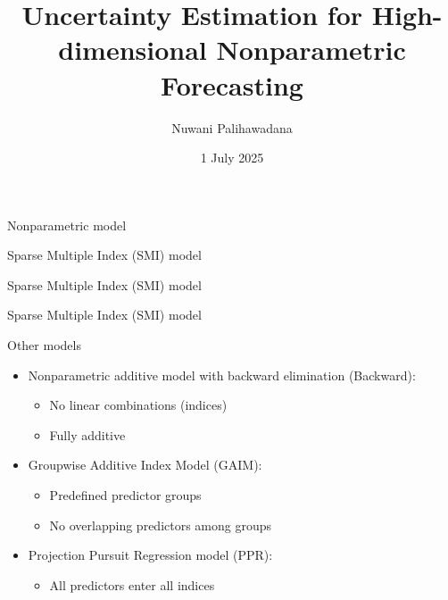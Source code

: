 \documentclass[
  12pt,
  ignorenonframetext,
  aspectratio=169,
]{beamer}
\title{Uncertainty Estimation for High-dimensional Nonparametric
Forecasting}
\author{Nuwani Palihawadana}
\date{1 July 2025}
\begin{document}
\frame{\titlepage}


\begin{frame}{Nonparametric model}
\label{nonparametric-model}
\end{frame}

\begin{frame}{Sparse Multiple Index (SMI) model}
\label{sparse-multiple-index-smi-model}
\end{frame}

\begin{frame}{Sparse Multiple Index (SMI) model}
\label{sparse-multiple-index-smi-model-1}
\end{frame}

\begin{frame}{Sparse Multiple Index (SMI) model}
\label{sparse-multiple-index-smi-model-2}
\end{frame}

\begin{frame}{Other models}
\label{other-models}
\begin{itemize}
  \item \color{violet} Nonparametric additive model with backward elimination (Backward):
  \begin{itemize}
    \item No linear combinations (indices)
    \item Fully additive \newline
  \end{itemize}
  \pause
  \item \color{violet} Groupwise Additive Index Model (GAIM):
  \begin{itemize}
    \item Predefined predictor groups
    \item No overlapping predictors among groups \newline
  \end{itemize}
  \pause
  \item \color{violet} Projection Pursuit Regression model (PPR):
  \begin{itemize}
    \item All predictors enter all indices
  \end{itemize}
\end{itemize}
\end{frame}
\end{document}
